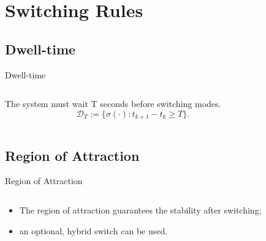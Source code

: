 
\section{Switching Rules}%
\label{sec:switching-rules}

\subsection{Dwell-time}%
\label{subsec:dwell-time}

\begin{slide}{Dwell-time}
  \begin{columns}[c]
    \begin{column}{0.48\textwidth}
      The system must wait T seconds before switching modes.
      \begin{equation}
        \mathcal{D}_{T} := \{\sigma(\cdot):t_{k+1}-t_{k}\ge{}T\}.
      \end{equation}
    \end{column}%
    \hfill%
    \begin{column}{0.48\textwidth}
      
    \end{column}%
  \end{columns}
\end{slide}

\subsection{Region of Attraction}%
\label{subsec:roa-rule}

\begin{slide}{Region of Attraction}
  \begin{columns}[c]
    \begin{column}{0.48\textwidth}
      \begin{itemize}
        \item The region of attraction guarantees the stability after switching;
        \item an optional, hybrid switch can be used.
      \end{itemize}
    \end{column}%
    \hfill%
    \begin{column}{0.48\textwidth}
      
    \end{column}%
  \end{columns}
\end{slide}

